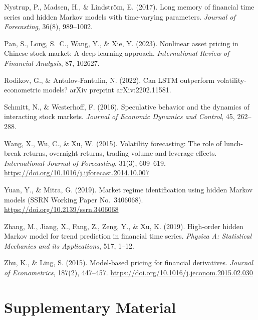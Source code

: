 \documentclass{article}
\begin{document}
\begin{description}[leftmargin=1.5em,labelindent=0pt,style=unboxed,itemsep=0.2em,topsep=0.2em]
\item Nystrup, P., Madsen, H., \& Lindstr\"om, E. (2017). Long memory of financial time series and hidden Markov models with time-varying parameters. \emph{Journal of Forecasting}, 36(8), 989--1002.

\item Pan, S., Long, S.~C., Wang, Y., \& Xie, Y. (2023). Nonlinear asset pricing in Chinese stock market: A deep learning approach. \emph{International Review of Financial Analysis}, 87, 102627.

\item Rodikov, G., \& Antulov-Fantulin, N. (2022). Can LSTM outperform volatility-econometric models? arXiv preprint arXiv:2202.11581.

\item Schmitt, N., \& Westerhoff, F. (2016). Speculative behavior and the dynamics of interacting stock markets. \emph{Journal of Economic Dynamics and Control}, 45, 262--288.

\item Wang, X., Wu, C., \& Xu, W. (2015). Volatility forecasting: The role of lunch-break returns, overnight returns, trading volume and leverage effects. \emph{International Journal of Forecasting}, 31(3), 609--619. \url{https://doi.org/10.1016/j.ijforecast.2014.10.007}

\item Yuan, Y., \& Mitra, G. (2019). Market regime identification using hidden Markov models (SSRN Working Paper No.\ 3406068). \url{https://doi.org/10.2139/ssrn.3406068}

\item Zhang, M., Jiang, X., Fang, Z., Zeng, Y., \& Xu, K. (2019). High-order hidden Markov model for trend prediction in financial time series. \emph{Physica A: Statistical Mechanics and its Applications}, 517, 1--12.

\item Zhu, K., \& Ling, S. (2015). Model-based pricing for financial derivatives. \emph{Journal of Econometrics}, 187(2), 447--457. \url{https://doi.org/10.1016/j.jeconom.2015.02.030}

\end{description}
\normalsize


\appendix
\raggedbottom

\section{Supplementary Material}
\label{app:info}
\end{document}
